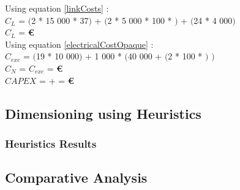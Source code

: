 Using equation \ref{linkCosts} : \\
$C_L$ = $($2 * 15 000 * 37$)$ + $($2 * 5 000 * 100 * $)$ + $($24 * 4 000$)$ \\
$C_L$ = \textbf{ \euro} \\

Using equation \ref{electricalCostOpaque} : \\
$C_{exc}$ = $($19 * 10 000$)$ + 1 000 * $($40 000 + $($2 * 100 * $)$ $)$ \\
$C_N$ = $C_{exc}$ = \textbf{ \euro} \\

$CAPEX$ =  +  = \textbf{ \euro}\\

\subsection{Dimensioning using Heuristics}

\subsubsection{Heuristics Results}

\subsection{Comparative Analysis}
